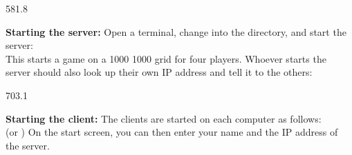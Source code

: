 \documentclass{aslab}
\begin{document}
\begin{region}[x=74.7,right=0]{581.8}
\begin{list}{}{\leftmargin=18bp\itemsep=0pt
  \parsep=0pt\topsep=0pt}
\item[\bfseries(A)\hfill] \textbf{Starting the server:} Open a terminal,
  change into the directory, and start the server:
  \blank
  \\
  \blank
  This starts a game on a 1000\,\texttimes\,1000 grid for four players.
  Whoever starts the server should also look up their own IP address and
  tell it to the others:
  \blank
\end{list}
\end{region}

\begin{region}[x=74.7,right=0]{703.1}
\begin{list}{}{\leftmargin=18bp\itemsep=0pt
  \parsep=0pt\topsep=0pt}
\item[\bfseries(B)\hfill] \textbf{Starting the client:} The clients are
  started on each computer as follows:
  \blank
  \\
  \hspace{3em}(or )
  \blank
  On the start screen, you can then enter your name and the IP address of
  the server.
\end{list}
\end{region}
\end{document}
